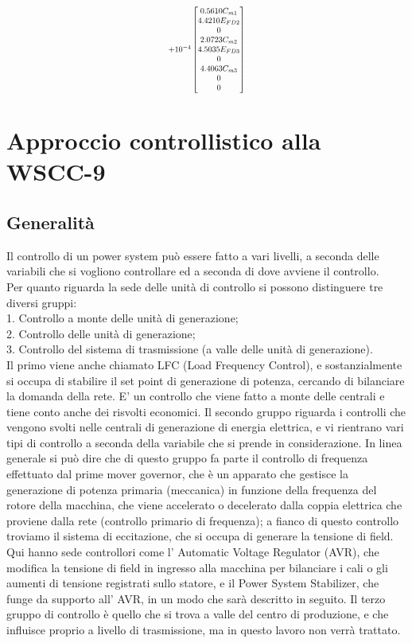 \documentclass[Lau,noexaminfo]{sapthesis}
\begin{document}
	\begin{equation*}
	\resizebox{0.2\hsize}{!}{$%
	+10^{-4}\begin{bmatrix}
	0.5610C_{m1}\\
	4.4210E_{FD2}\\
	0\\
	2.0723C_{m2}\\
	4.5035E_{FD3}\\
	0\\
	4.4063C_{m3}\\
	0\\
	0
	\end{bmatrix}$%
	}%
	\end{equation*}
	
	 	
	\section{Approccio controllistico alla WSCC-9}
	\subsection{Generalità}
	Il controllo di un power system può essere fatto a vari livelli, a seconda delle variabili che si vogliono controllare ed a seconda di dove avviene il controllo.\\
	Per quanto riguarda la sede delle unità di controllo si possono distinguere tre diversi gruppi:\\
	1. Controllo a monte delle unità di generazione;\\
	2. Controllo delle unità di generazione;\\
	3. Controllo del sistema di trasmissione (a valle delle unità di generazione).\\
	Il primo viene anche chiamato LFC (Load Frequency Control), e sostanzialmente si occupa di stabilire il set point di generazione di potenza, cercando di bilanciare la domanda della rete. E' un controllo che viene fatto a monte delle centrali e tiene conto anche dei risvolti economici. Il secondo gruppo riguarda i controlli che vengono svolti nelle centrali di generazione di energia elettrica, e vi rientrano vari tipi di controllo a seconda della variabile che si prende in considerazione. In linea generale si può dire che di questo gruppo fa parte il controllo di frequenza effettuato dal prime mover governor, che è un apparato che gestisce la generazione di potenza primaria (meccanica) in funzione della frequenza del rotore della macchina, che viene accelerato o decelerato dalla coppia elettrica che proviene dalla rete (controllo primario di frequenza);
	a fianco di questo controllo troviamo il sistema di eccitazione, che si occupa di generare la tensione di field. Qui hanno sede controllori come l' Automatic Voltage Regulator (AVR), che modifica la tensione di field in ingresso alla macchina per bilanciare i cali o gli aumenti di tensione registrati sullo statore, e il Power System Stabilizer, che funge da supporto all' AVR, in un modo che sarà descritto in seguito. Il terzo gruppo di controllo è quello che si trova a valle del centro di produzione, e che influisce proprio a livello di trasmissione, ma in questo lavoro non verrà trattato.
\end{document}
